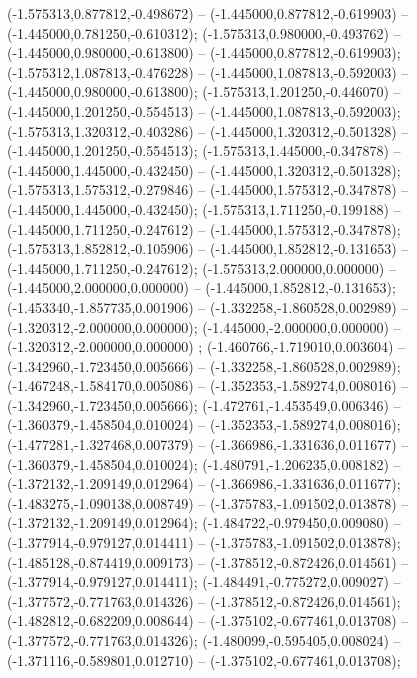  (-1.575313,0.877812,-0.498672) -- (-1.445000,0.877812,-0.619903) -- (-1.445000,0.781250,-0.610312);
 (-1.575313,0.980000,-0.493762) -- (-1.445000,0.980000,-0.613800) -- (-1.445000,0.877812,-0.619903);
 (-1.575312,1.087813,-0.476228) -- (-1.445000,1.087813,-0.592003) -- (-1.445000,0.980000,-0.613800);
 (-1.575313,1.201250,-0.446070) -- (-1.445000,1.201250,-0.554513) -- (-1.445000,1.087813,-0.592003);
 (-1.575313,1.320312,-0.403286) -- (-1.445000,1.320312,-0.501328) -- (-1.445000,1.201250,-0.554513);
 (-1.575313,1.445000,-0.347878) -- (-1.445000,1.445000,-0.432450) -- (-1.445000,1.320312,-0.501328);
 (-1.575313,1.575312,-0.279846) -- (-1.445000,1.575312,-0.347878) -- (-1.445000,1.445000,-0.432450);
 (-1.575313,1.711250,-0.199188) -- (-1.445000,1.711250,-0.247612) -- (-1.445000,1.575312,-0.347878);
 (-1.575313,1.852812,-0.105906) -- (-1.445000,1.852812,-0.131653) -- (-1.445000,1.711250,-0.247612);
 (-1.575313,2.000000,0.000000) -- (-1.445000,2.000000,0.000000) -- (-1.445000,1.852812,-0.131653);
 (-1.453340,-1.857735,0.001906) -- (-1.332258,-1.860528,0.002989) -- (-1.320312,-2.000000,0.000000);
 (-1.445000,-2.000000,0.000000) -- (-1.320312,-2.000000,0.000000) ;
 (-1.460766,-1.719010,0.003604) -- (-1.342960,-1.723450,0.005666) -- (-1.332258,-1.860528,0.002989);
 (-1.467248,-1.584170,0.005086) -- (-1.352353,-1.589274,0.008016) -- (-1.342960,-1.723450,0.005666);
 (-1.472761,-1.453549,0.006346) -- (-1.360379,-1.458504,0.010024) -- (-1.352353,-1.589274,0.008016);
 (-1.477281,-1.327468,0.007379) -- (-1.366986,-1.331636,0.011677) -- (-1.360379,-1.458504,0.010024);
 (-1.480791,-1.206235,0.008182) -- (-1.372132,-1.209149,0.012964) -- (-1.366986,-1.331636,0.011677);
 (-1.483275,-1.090138,0.008749) -- (-1.375783,-1.091502,0.013878) -- (-1.372132,-1.209149,0.012964);
 (-1.484722,-0.979450,0.009080) -- (-1.377914,-0.979127,0.014411) -- (-1.375783,-1.091502,0.013878);
 (-1.485128,-0.874419,0.009173) -- (-1.378512,-0.872426,0.014561) -- (-1.377914,-0.979127,0.014411);
 (-1.484491,-0.775272,0.009027) -- (-1.377572,-0.771763,0.014326) -- (-1.378512,-0.872426,0.014561);
 (-1.482812,-0.682209,0.008644) -- (-1.375102,-0.677461,0.013708) -- (-1.377572,-0.771763,0.014326);
 (-1.480099,-0.595405,0.008024) -- (-1.371116,-0.589801,0.012710) -- (-1.375102,-0.677461,0.013708);
